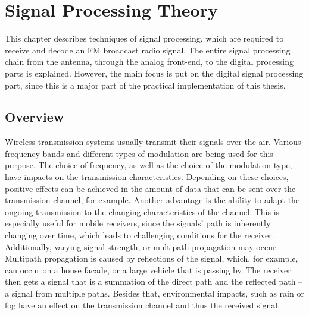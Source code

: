 \chapter{Signal Processing Theory}
\label{cha:SignalProcessingTheory}

This chapter describes techniques of signal processing, which are required to receive and decode an FM broadcast radio signal.
The entire signal processing chain from the antenna, through the analog front-end, to the digital processing parts is explained.
However, the main focus is put on the digital signal processing part, since this is a major part of the practical implementation of this thesis.

\section{Overview}

Wireless transmission systems usually transmit their signals over the air.
Various frequency bands and different types of modulation are being used for this purpose.
The choice of frequency, as well as the choice of the modulation type, have impacts on the transmission characteristics.
Depending on these choices, positive effects can be achieved in the amount of data that can be sent over the transmission channel, for example.
Another advantage is the ability to adapt the ongoing transmission to the changing characteristics of the channel.
This is especially useful for mobile receivers, since the signals' path is inherently changing over time, which leads to challenging conditions for the receiver.
Additionally, varying signal strength, or multipath propagation may occur.
Multipath propagation is caused by reflections of the signal, which, for example, can occur on a house facade, or a large vehicle that is passing by.
The receiver then gets a signal that is a summation of the direct path and the reflected path -- a signal from multiple paths.
Besides that, environmental impacts, such as rain or fog have an effect on the transmission channel and thus the received signal.\\

